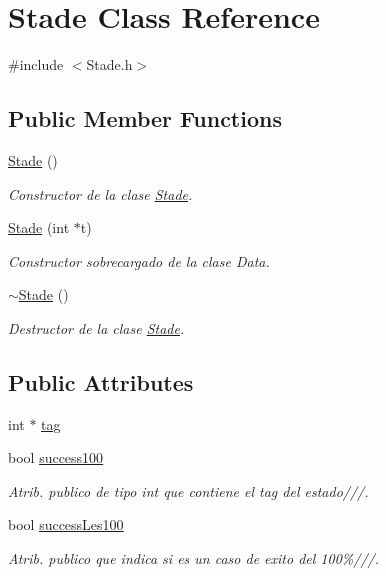 \hypertarget{class_stade}{\section{Stade Class Reference}
\label{class_stade}
}


{\ttfamily \#include $<$Stade.\+h$>$}

\subsection*{Public Member Functions}
\begin{DoxyCompactItemize}
\item 
\hyperlink{class_stade_a0b456ba62c0e36e23770d7f97bb090e7}{Stade} ()
\begin{DoxyCompactList}\small\item\em Constructor de la clase \hyperlink{class_stade}{Stade}. \end{DoxyCompactList}\item 
\hyperlink{class_stade_a7bdc8d5eb5e36b31e4ad46e58447cd48}{Stade} (int $\ast$t)
\begin{DoxyCompactList}\small\item\em Constructor sobrecargado de la clase Data. \end{DoxyCompactList}\item 
\hyperlink{class_stade_abdea3c92c222929ebf3c6f5615085529}{$\sim$\+Stade} ()
\begin{DoxyCompactList}\small\item\em Destructor de la clase \hyperlink{class_stade}{Stade}. \end{DoxyCompactList}\end{DoxyCompactItemize}
\subsection*{Public Attributes}
\begin{DoxyCompactItemize}
\item 
int $\ast$ \hyperlink{class_stade_ad941a9ee2d5283e933be7dc4bb6096fc}{tag}
\item 
bool \hyperlink{class_stade_a4f818739089a18e7bba2f8187088fb9b}{success100}
\begin{DoxyCompactList}\small\item\em Atrib. publico de tipo int que contiene el tag del estado///. \end{DoxyCompactList}\item 
bool \hyperlink{class_stade_a108a9c100d92ca8a822516376c79ac77}{success\+Les100}
\begin{DoxyCompactList}\small\item\em Atrib. publico que indica si es un caso de exito del 100\%///. \end{DoxyCompactList}\end{DoxyCompactItemize}



